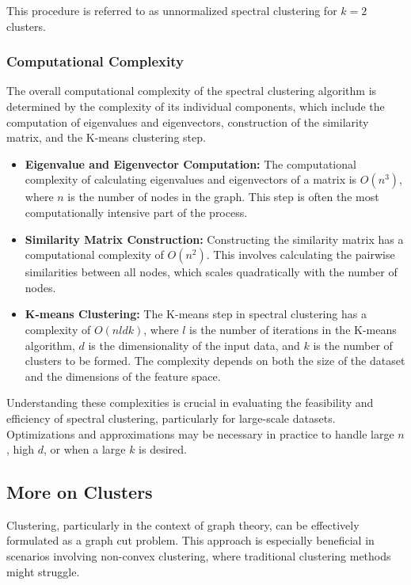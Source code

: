 \documentclass[unicode,11pt,a4paper,oneside,numbers=endperiod,openany]{scrartcl}
\begin{document}
This procedure is referred to as unnormalized spectral clustering for \( k = 2 \) clusters.


\subsubsection{Computational Complexity}

The overall computational complexity of the spectral clustering algorithm is determined by the complexity of its individual components, which include the computation of eigenvalues and eigenvectors, construction of the similarity matrix, and the K-means clustering step.

\begin{itemize}
    \item \textbf{Eigenvalue and Eigenvector Computation:} The computational complexity of calculating eigenvalues and eigenvectors of a matrix is \( O(n^3) \), where \( n \) is the number of nodes in the graph. This step is often the most computationally intensive part of the process.

    \item \textbf{Similarity Matrix Construction:} Constructing the similarity matrix has a computational complexity of \( O(n^2) \). This involves calculating the pairwise similarities between all nodes, which scales quadratically with the number of nodes.

    \item \textbf{K-means Clustering:} The K-means step in spectral clustering has a complexity of \( O(nldk) \), where \( l \) is the number of iterations in the K-means algorithm, \( d \) is the dimensionality of the input data, and \( k \) is the number of clusters to be formed. The complexity depends on both the size of the dataset and the dimensions of the feature space.
\end{itemize}

Understanding these complexities is crucial in evaluating the feasibility and efficiency of spectral clustering, particularly for large-scale datasets. Optimizations and approximations may be necessary in practice to handle large \( n \), high \( d \), or when a large \( k \) is desired.

\subsection{More on Clusters}

Clustering, particularly in the context of graph theory, can be effectively formulated as a graph cut problem. This approach is especially beneficial in scenarios involving non-convex clustering, where traditional clustering methods might struggle.
\end{document}
